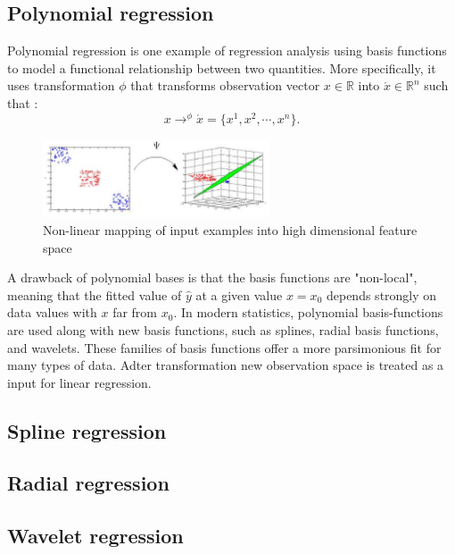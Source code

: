 \subsection{Polynomial regression}
Polynomial regression is one example of regression analysis using basis functions to model 
a functional relationship between two quantities.
More specifically, it uses transformation $\phi$  that transforms observation vector 
$x \in \mathbb{R}$ into  $ \acute{x} \in \mathbb{R}^{n}$ such that :
\begin{equation}
 x \to^{\phi} \acute{x} = \{x^{1}, x^{2}, \cdots, x^{n}\}.
\end{equation}
\begin{figure}[htb] 
	\label{fig:space_transformation}
	\centering
	\includegraphics[width=0.6\textwidth]{figures/space_transformation}
	\caption{Non-linear mapping of input examples into high dimensional feature space}
\end{figure}
A drawback of polynomial bases is that the basis functions are "non-local",
meaning that the fitted value of $\hat{y}$ at a given value $x = x_{0}$ depends strongly on 
data values with $x$ far from $x_{0}$.
In modern statistics, polynomial basis-functions are used along with new basis functions,
such as splines, radial basis functions, and wavelets.
These families of basis functions offer a more parsimonious fit for many types of data. 
Adter transformation new observation space is treated as a input for linear regression.

\subsection{Spline regression}
\subsection{Radial regression}
\subsection{Wavelet regression}


